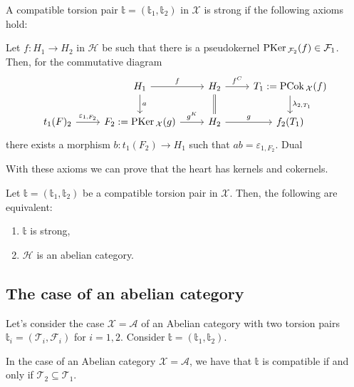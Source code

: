\begin{definition}
  A compatible torsion pair $\mathbb{t}=(\mathbb{t}_1,\mathbb{t}_2)$ in $\mathcal{X}$
  is strong if the following axioms hold:
  \begin{torsionaxioms}
    \setcounter{enumi}{3}
    \item Let $f:H_1\to H_2$ in $\mathcal{H}$ be such that there is a pseudokernel
    $\mathrm{\textup{PKer\,}}_{\mathcal{F}_2}(f)\in\mathcal{F}_1$. Then, for the commutative diagram
    \begin{equation*}
      \begin{tikzcd}
        & H_1\arrow{d}{a}\arrow{r}{f}
          & H_2\arrow[equal]{d}\arrow{r}{f^C}
            & T_1:=\PCok_\mathcal{X}(f)\arrow{d}{\lambda_{2,T_1}}\\
        t_1(F)_2\arrow{r}{\varepsilon_{1,F_2}}
        & F_2:=\PKer_\mathcal{X}(g)\arrow{r}{g^K}
          & H_2\arrow{r}{g}
            & f_2(T_1)
      \end{tikzcd}
    \end{equation*}
    there exists a morphism $b:t_1(F_2)\to H_1$ such that $ab=\varepsilon_{1,F_2}$.
    \varitem{^\ast} Dual
  \end{torsionaxioms}
\end{definition}

With these axioms we can prove that the heart has kernels and cokernels.

\begin{thm}
  Let $\mathbb{t}=(\mathbb{t}_1,\mathbb{t}_2)$ be a compatible torsion pair in $\mathcal{X}$. Then, the following are
  equivalent:
  \begin{enumerate}[ref=(a)]
    \item $\mathbb{t}$ is strong,
    \item $\mathcal{H}$ is an abelian category.
  \end{enumerate}
\end{thm}

\subsection{The case of an abelian category}

Let's consider the case $\mathcal{X}=\mathcal{A}$ of an Abelian category with
two torsion pairs $\mathbb{t}_i=(\mathcal{T}_i,\mathcal{F}_i)$ for $i=1,2$.
Consider $\mathbb{t}=(\mathbb{t}_1,\mathbb{t}_2)$.

\begin{rmk}\label{rmk:2.2}
  In the case of an Abelian category $\mathcal{X}=\mathcal{A}$, we have that
  $\mathbb{t}$ is compatible if and only if $\mathcal{T}_2\subseteq\mathcal{T}_1$.
\end{rmk}

